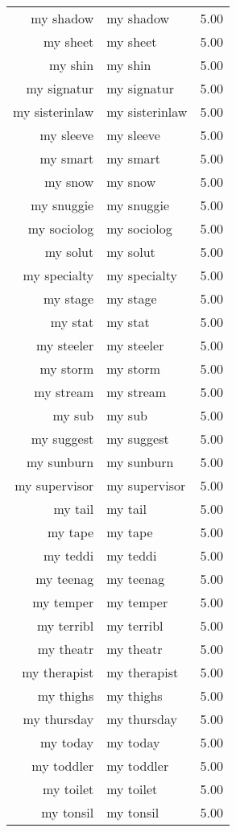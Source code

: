 \begin{table}[ht]
\begin{tabular}{rlr}
  my shadow & my shadow & 5.00 \\ 
  my sheet & my sheet & 5.00 \\ 
  my shin & my shin & 5.00 \\ 
  my signatur & my signatur & 5.00 \\ 
  my sisterinlaw & my sisterinlaw & 5.00 \\ 
  my sleeve & my sleeve & 5.00 \\ 
  my smart & my smart & 5.00 \\ 
  my snow & my snow & 5.00 \\ 
  my snuggie & my snuggie & 5.00 \\ 
  my sociolog & my sociolog & 5.00 \\ 
  my solut & my solut & 5.00 \\ 
  my specialty & my specialty & 5.00 \\ 
  my stage & my stage & 5.00 \\ 
  my stat & my stat & 5.00 \\ 
  my steeler & my steeler & 5.00 \\ 
  my storm & my storm & 5.00 \\ 
  my stream & my stream & 5.00 \\ 
  my sub & my sub & 5.00 \\ 
  my suggest & my suggest & 5.00 \\ 
  my sunburn & my sunburn & 5.00 \\ 
  my supervisor & my supervisor & 5.00 \\ 
  my tail & my tail & 5.00 \\ 
  my tape & my tape & 5.00 \\ 
  my teddi & my teddi & 5.00 \\ 
  my teenag & my teenag & 5.00 \\ 
  my temper & my temper & 5.00 \\ 
  my terribl & my terribl & 5.00 \\ 
  my theatr & my theatr & 5.00 \\ 
  my therapist & my therapist & 5.00 \\ 
  my thighs & my thighs & 5.00 \\ 
  my thursday & my thursday & 5.00 \\ 
  my today & my today & 5.00 \\ 
  my toddler & my toddler & 5.00 \\ 
  my toilet & my toilet & 5.00 \\ 
  my tonsil & my tonsil & 5.00 \\ 

\end{tabular}
\end{table}
